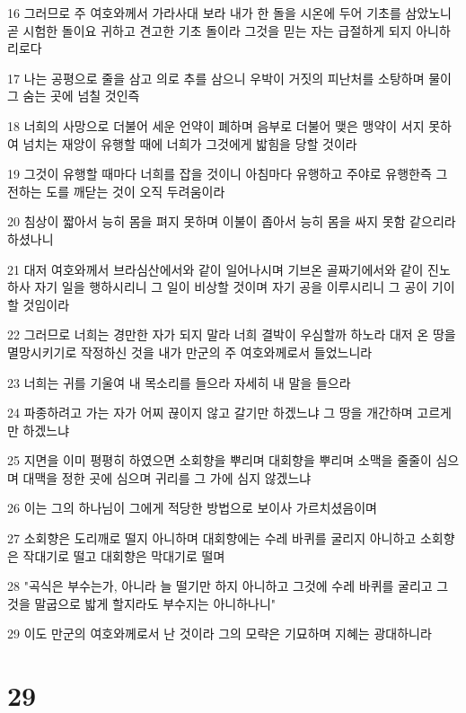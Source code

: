 \par 16 그러므로 주 여호와께서 가라사대 보라 내가 한 돌을 시온에 두어 기초를 삼았노니 곧 시험한 돌이요 귀하고 견고한 기초 돌이라 그것을 믿는 자는 급절하게 되지 아니하리로다
\par 17 나는 공평으로 줄을 삼고 의로 추를 삼으니 우박이 거짓의 피난처를 소탕하며 물이 그 숨는 곳에 넘칠 것인즉
\par 18 너희의 사망으로 더불어 세운 언약이 폐하며 음부로 더불어 맺은 맹약이 서지 못하여 넘치는 재앙이 유행할 때에 너희가 그것에게 밟힘을 당할 것이라
\par 19 그것이 유행할 때마다 너희를 잡을 것이니 아침마다 유행하고 주야로 유행한즉 그 전하는 도를 깨닫는 것이 오직 두려움이라
\par 20 침상이 짧아서 능히 몸을 펴지 못하며 이불이 좁아서 능히 몸을 싸지 못함 같으리라 하셨나니
\par 21 대저 여호와께서 브라심산에서와 같이 일어나시며 기브온 골짜기에서와 같이 진노하사 자기 일을 행하시리니 그 일이 비상할 것이며 자기 공을 이루시리니 그 공이 기이할 것임이라
\par 22 그러므로 너희는 경만한 자가 되지 말라 너희 결박이 우심할까 하노라 대저 온 땅을 멸망시키기로 작정하신 것을 내가 만군의 주 여호와께로서 들었느니라
\par 23 너희는 귀를 기울여 내 목소리를 들으라 자세히 내 말을 들으라
\par 24 파종하려고 가는 자가 어찌 끊이지 않고 갈기만 하겠느냐 그 땅을 개간하며 고르게만 하겠느냐
\par 25 지면을 이미 평평히 하였으면 소회향을 뿌리며 대회향을 뿌리며 소맥을 줄줄이 심으며 대맥을 정한 곳에 심으며 귀리를 그 가에 심지 않겠느냐
\par 26 이는 그의 하나님이 그에게 적당한 방법으로 보이사 가르치셨음이며
\par 27 소회향은 도리깨로 떨지 아니하며 대회향에는 수레 바퀴를 굴리지 아니하고 소회향은 작대기로 떨고 대회향은 막대기로 떨며
\par 28 "곡식은 부수는가, 아니라 늘 떨기만 하지 아니하고 그것에 수레 바퀴를 굴리고 그것을 말굽으로 밟게 할지라도 부수지는 아니하나니"
\par 29 이도 만군의 여호와께로서 난 것이라 그의 모략은 기묘하며 지혜는 광대하니라

\chapter{29}

